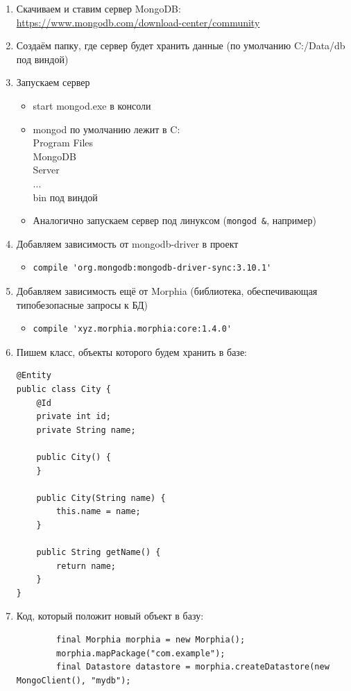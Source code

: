 \documentclass[a5paper]{article}
\begin{document}
\begin{enumerate}
	\item Скачиваем и ставим сервер MongoDB: \url{https://www.mongodb.com/download-center/community}
	\item Создаём папку, где сервер будет хранить данные (по умолчанию C:/Data/db под виндой)
	\item Запускаем сервер
	\begin{itemize}
		\item start mongod.exe в консоли
		\item mongod по умолчанию лежит в C:\\Program Files\\MongoDB\\Server\\...\\bin под виндой
		\item Аналогично запускаем сервер под линуксом (\verb|mongod &|, например)
	\end{itemize}
	\item Добавляем зависимость от mongodb-driver в проект
	\begin{itemize}
		\item
			\begin{verbatim}
compile 'org.mongodb:mongodb-driver-sync:3.10.1'
			\end{verbatim}
	\end{itemize}
	\item Добавляем зависимость ещё от Morphia (библиотека, обеспечивающая типобезопасные запросы к БД)
	\begin{itemize}
		\item
			\begin{verbatim}
compile 'xyz.morphia.morphia:core:1.4.0'
			\end{verbatim}
	\end{itemize}
	\item Пишем класс, объекты которого будем хранить в базе:
		\begin{verbatim}
@Entity
public class City {
    @Id
    private int id;
    private String name;

    public City() {
    }

    public City(String name) {
        this.name = name;
    }

    public String getName() {
        return name;
    }
}
		\end{verbatim}
	\item Код, который положит новый объект в базу:
	\begin{verbatim}
        final Morphia morphia = new Morphia();
        morphia.mapPackage("com.example");
        final Datastore datastore = morphia.createDatastore(new MongoClient(), "mydb");


\end{verbatim}
\end{enumerate}
\end{document}

